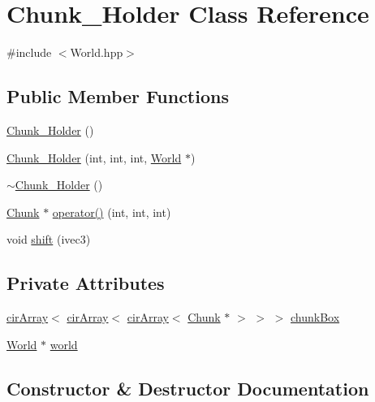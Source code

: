 \hypertarget{classChunk__Holder}{}\section{Chunk\+\_\+\+Holder Class Reference}
\label{classChunk__Holder}


{\ttfamily \#include $<$World.\+hpp$>$}

\subsection*{Public Member Functions}
\begin{DoxyCompactItemize}
\item 
\mbox{\hyperlink{classChunk__Holder_a8f7d32d8d1adf4a991819e33aeddab57}{Chunk\+\_\+\+Holder}} ()
\item 
\mbox{\hyperlink{classChunk__Holder_ab845ac52de9aacae0ea0774ecc531ae9}{Chunk\+\_\+\+Holder}} (int, int, int, \mbox{\hyperlink{classWorld}{World}} $\ast$)
\item 
\mbox{\hyperlink{classChunk__Holder_a7375802ba42f6851efa425bcdbbfe4c2}{$\sim$\+Chunk\+\_\+\+Holder}} ()
\item 
\mbox{\hyperlink{classChunk}{Chunk}} $\ast$ \mbox{\hyperlink{classChunk__Holder_aea3fa247a63abc4ff78af82f901840df}{operator()}} (int, int, int)
\item 
void \mbox{\hyperlink{classChunk__Holder_a383070a12c061c7a1a989af13adcef56}{shift}} (ivec3)
\end{DoxyCompactItemize}
\subsection*{Private Attributes}
\begin{DoxyCompactItemize}
\item 
\mbox{\hyperlink{classcirArray}{cir\+Array}}$<$ \mbox{\hyperlink{classcirArray}{cir\+Array}}$<$ \mbox{\hyperlink{classcirArray}{cir\+Array}}$<$ \mbox{\hyperlink{classChunk}{Chunk}} $\ast$ $>$ $>$ $>$ \mbox{\hyperlink{classChunk__Holder_a50d70dce3408437c449b72ab85bfa435}{chunk\+Box}}
\item 
\mbox{\hyperlink{classWorld}{World}} $\ast$ \mbox{\hyperlink{classChunk__Holder_acc9696ef1450d475db150e000bc03c87}{world}}
\end{DoxyCompactItemize}


\subsection{Constructor \& Destructor Documentation}
\mbox{\label{classChunk__Holder_a8f7d32d8d1adf4a991819e33aeddab57}} 
